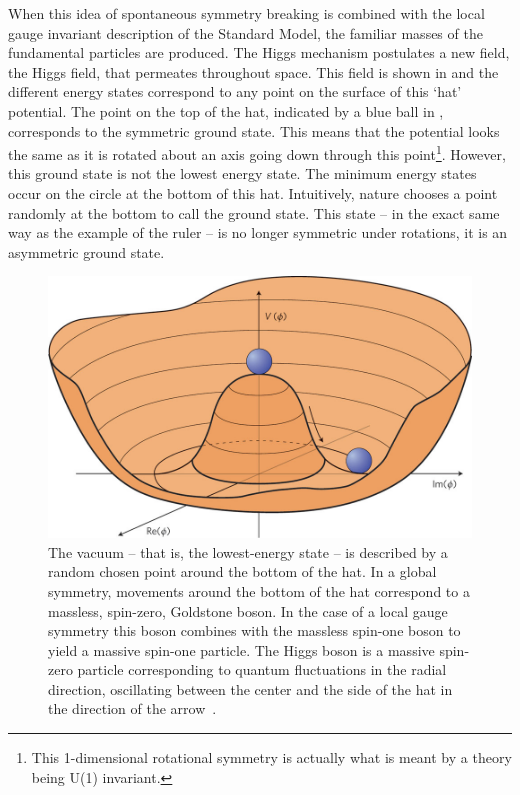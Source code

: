 When this idea of spontaneous symmetry breaking is combined with the local gauge
invariant description of the Standard Model, the familiar masses of the fundamental
particles are produced. The Higgs mechanism postulates a new field, the Higgs field,
that permeates throughout space. This field is shown in  and
the different energy states correspond to any point on the surface of this
`hat' potential. The point on the top of the hat, indicated by a blue ball
in , corresponds to the symmetric ground state. This
means that the potential looks the same as it is rotated about an
axis going down through this point\footnote{This 1-dimensional rotational
symmetry is actually what is meant by a theory being U(1) invariant.}. However,
this ground state is not the lowest energy state. The minimum energy states
occur on the circle at the bottom of this hat. Intuitively, nature
chooses a point randomly at the bottom to call the ground state.
This state -- in the exact same way as the example of the ruler -- is no longer
symmetric under rotations, it is an asymmetric ground state.

\begin{figure}[htbp]
    \centering
    \includegraphics[scale=0.35, angle=0]{./figures/HiggsPotential}
    \caption{The vacuum -- that is, the lowest-energy state -- is described by
    a random chosen point around the bottom of the hat. In a global symmetry,
    movements around the bottom of the hat correspond to a massless, spin-zero,
    Goldstone boson. In the case of a local gauge symmetry this boson combines
    with the massless spin-one boson to yield a massive spin-one particle. The
    Higgs boson is a massive spin-zero particle corresponding to quantum
    fluctuations in the radial direction, oscillating between the center and
    the side of the hat in the direction of the arrow~\cite{HiggsPic}.}
    \label{fig:higgspotential}
\end{figure}

